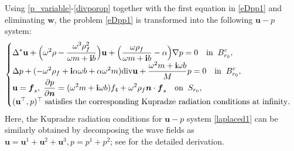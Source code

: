\documentclass[11pt]{article}
\newcommand{\ds}{\displaystyle}
\newcommand{\pa}{\partial}
\newcommand{\dive}{{\rm div}}
\newcommand{\bs}{\boldsymbol}
\begin{document}
Using \eqref{p_variable}-\eqref{divporop} together with the first equation in \eqref{eDpp1} and 
eliminating $\mathbf{w}$, the problem \eqref{eDpp1} is transformed into the following $\mathbf{u}-p$ system:
\begin{equation}\label{laplaced1}
\begin{cases}
\ds\Delta^*\mathbf{u}+\Big(\omega^2 \rho -\frac{\omega^3 \rho_f^2}{{\omega m+\bf{i}}b}\Big)\mathbf{u}
+\Big(\frac{\omega\rho_f}{{\omega m+\bf{i}}b}-\alpha\Big)\nabla p=0 \quad {\rm in}\;\;B_{r_0}^c,\\
\ds\Delta p+(-\omega^2\rho_f+{\bf{i}}\alpha\omega b+\alpha\omega^2m)\dive\mathbf{u}+\frac{\omega^2m
+{\bf{i}}\omega b}{M}p=0 \quad {\rm in}\;\;B_{r_0}^c,\\
\ds\mathbf{u}=\bs{f}_s,\;\frac{\pa p }{\pa \bs{n}}=(\omega^2m+{\bf{i}}\omega b)f_4+
\omega^2\rho_f\bs{n}\cdot \bs{f}_s \quad {\rm on} \;\;S_{r_0},\\
(\mathbf{u}^{\top},p)^{\top}\;\text{satisfies the corresponding Kupradze radiation conditions at infinity}.
\end{cases}
\end{equation}
Here, the Kupradze radiation conditions for $\mathbf{u}-p$ system \eqref{laplaced1} can be similarly 
obtained by decomposing the wave fields as $\mathbf{u}=\mathbf{u}^1+\mathbf{u}^2+\mathbf{u}^3, p=p^1+p^2$; 
see \cite[Section 2]{zhang2022} for the detailed derivation. 
\end{document}
